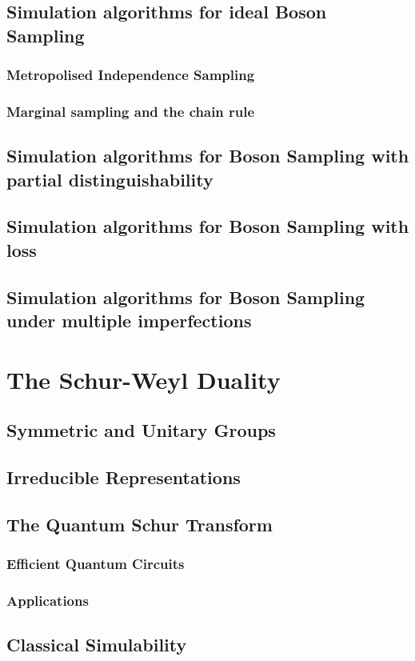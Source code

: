 \subsection{Simulation algorithms for ideal Boson Sampling}

\subsubsection{Metropolised Independence Sampling}

\subsubsection{Marginal sampling and the chain rule}

\subsection{Simulation algorithms for Boson Sampling with partial distinguishability}

\subsection{Simulation algorithms for Boson Sampling with loss}

\subsection{Simulation algorithms for Boson Sampling under multiple imperfections}

\section{The Schur-Weyl Duality}

\subsection{Symmetric and Unitary Groups}

\subsection{Irreducible Representations}

\subsection{The Quantum Schur Transform}

\subsubsection{Efficient Quantum Circuits}

\subsubsection{Applications}

\subsection{Classical Simulability}